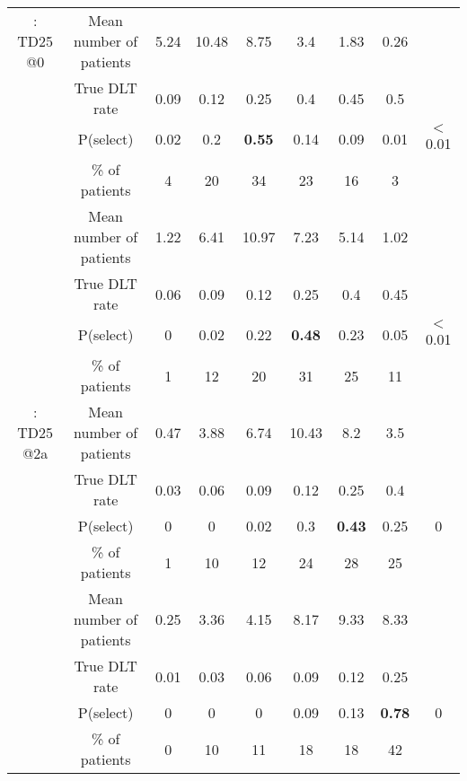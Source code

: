 \begin{table}[h!]
\begin{singlespace}
{\begin{tabular}[t]{ccccccccc}
				\multirow{-4}{*}{\centering\arraybackslash 2: TD25 @0} & Mean number of patients & 5.24 & 10.48 & 8.75 & 3.4 & 1.83 & 0.26 & \\
				\cmidrule{1-9}
				\rowcolor{gray!6}   & True DLT rate & 0.09 & 0.12 & 0.25 & 0.4 & 0.45 & 0.5 & \\
				
				\rowcolor{gray!6}   & P(select) & 0.02 & 0.2 & \textbf{0.55} & 0.14 & 0.09 & 0.01 & $<$0.01\\
				
				\rowcolor{gray!6}   & \% of patients & 4 & 20 & 34 & 23 & 16 & 3 & \\
				
				\rowcolor{gray!6}  \multirow{-4}{*}{\centering\arraybackslash 3: TD25 @1} & Mean number of patients & 1.22 & 6.41 & 10.97 & 7.23 & 5.14 & 1.02 & \\
				\cmidrule{1-9}
				& True DLT rate & 0.06 & 0.09 & 0.12 & 0.25 & 0.4 & 0.45 & \\
				
				& P(select) & 0 & 0.02 & 0.22 & \textbf{0.48} & 0.23 & 0.05 & $<$0.01\\
				
				& \% of patients & 1 & 12 & 20 & 31 & 25 & 11 & \\
				
				\multirow{-4}{*}{\centering\arraybackslash 4: TD25 @2a} & Mean number of patients & 0.47 & 3.88 & 6.74 & 10.43 & 8.2 & 3.5 & \\
				\cmidrule{1-9}
				\rowcolor{gray!6}   & True DLT rate & 0.03 & 0.06 & 0.09 & 0.12 & 0.25 & 0.4 & \\
				
				\rowcolor{gray!6}   & P(select) & 0 & 0 & 0.02 & 0.3 & \textbf{0.43} & 0.25 & 0\\
				
				\rowcolor{gray!6}   & \% of patients & 1 & 10 & 12 & 24 & 28 & 25 & \\
				
				\rowcolor{gray!6}  \multirow{-4}{*}{\centering\arraybackslash 5: TD25 @2b} & Mean number of patients & 0.25 & 3.36 & 4.15 & 8.17 & 9.33 & 8.33 & \\
				\cmidrule{1-9}
				& True DLT rate & 0.01 & 0.03 & 0.06 & 0.09 & 0.12 & 0.25 & \\
				
				& P(select) & 0 & 0 & 0 & 0.09 & 0.13 & \textbf{0.78} & 0\\
				
				& \% of patients & 0 & 10 & 11 & 18 & 18 & 42 & \\
				

\end{tabular}}
\end{singlespace}
\end{table}

